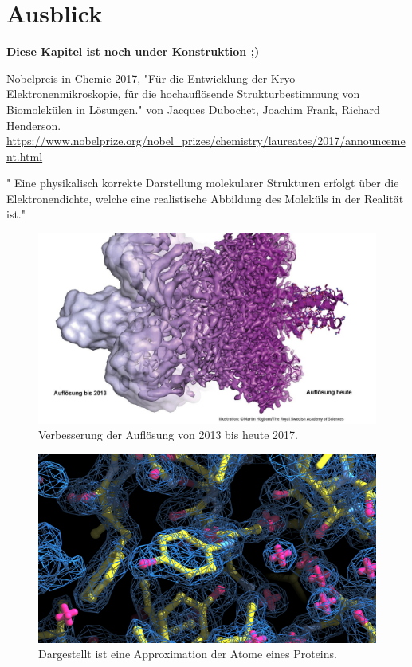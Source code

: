 \chapter{Ausblick}

\textbf{Diese Kapitel ist noch under Konstruktion ;)}

Nobelpreis in Chemie 2017, "Für die Entwicklung der Kryo-Elektronenmikroskopie, für die hochauflösende Strukturbestimmung von Biomolekülen in Lösungen." von Jacques Dubochet, Joachim Frank, Richard Henderson. 
\url{https://www.nobelprize.org/nobel_prizes/chemistry/laureates/2017/announcement.html}


" Eine physikalisch korrekte Darstellung molekularer Strukturen erfolgt über die Elektronendichte, welche eine realistische Abbildung des Moleküls in der Realität ist."


\begin{figure}
    \centering
    \includegraphics[width=.95\textwidth]{images/Verbesserung_der_Aufloesung.jpg}
    \caption{Verbesserung der Auflösung von 2013 bis heute 2017\protect\footnotemark{}.}
    \label{fig:auflösung}
\end{figure}



\begin{figure}
    \centering
    \includegraphics[width=.95\textwidth]{images/approximation.png}
    \caption{Dargestellt ist eine Approximation der Atome eines Proteins.}
    \label{fig:approximation}
\end{figure}





